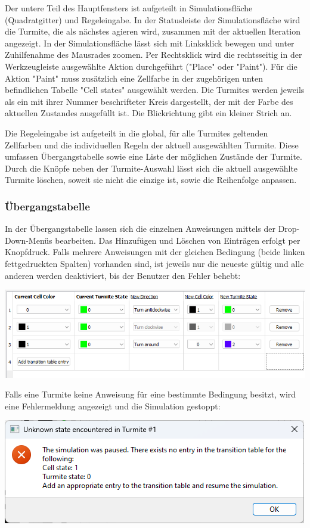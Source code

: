 Der untere Teil des Hauptfensters ist aufgeteilt in Simulationsfläche (Quadratgitter) und Regeleingabe. In der Statusleiste der Simulationsfläche wird die Turmite, die als nächstes agieren wird, zusammen mit der aktuellen Iteration angezeigt. In der Simulationsfläche lässt sich mit Linksklick bewegen und unter Zuhilfenahme des Mausrades zoomen. Per Rechtsklick wird die rechtsseitig in der Werkzeugleiste ausgewählte Aktion durchgeführt ("Place" oder "Paint"). Für die Aktion "Paint" muss zusätzlich eine Zellfarbe in der zugehörigen unten befindlichen Tabelle "Cell states" ausgewählt werden. Die Turmites werden jeweils als ein mit ihrer Nummer beschrifteter Kreis dargestellt, der mit der Farbe des aktuellen Zustandes ausgefüllt ist. Die Blickrichtung gibt ein kleiner Strich an.

Die Regeleingabe ist aufgeteilt in die global, für alle Turmites geltenden Zellfarben und die individuellen Regeln der aktuell ausgewählten Turmite. Diese umfassen Übergangstabelle sowie eine Liste der möglichen Zustände der Turmite. Durch die Knöpfe neben der Turmite-Auswahl lässt sich die aktuell ausgewählte Turmite löschen, soweit sie nicht die einzige ist, sowie die Reihenfolge anpassen. 

\subsubsection{Übergangstabelle}
In der Übergangstabelle lassen sich die einzelnen Anweisungen mittels der Drop-Down-Menüs bearbeiten. Das Hinzufügen und Löschen von Einträgen erfolgt per Knopfdruck. Falls mehrere Anweisungen mit der gleichen Bedingung (beide linken fettgedruckten Spalten) vorhanden sind, ist jeweils nur die neueste gültig und alle anderen werden deaktiviert, bis der Benutzer den Fehler behebt:

\includegraphics[width=\textwidth]{invalid_table.png}

Falls eine Turmite keine Anweisung für eine bestimmte Bedingung besitzt, wird eine Fehlermeldung angezeigt und die Simulation gestoppt:

\includegraphics[width=\textwidth]{unknown_state.png}

